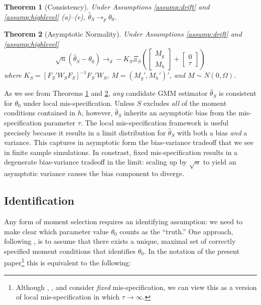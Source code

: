 \documentclass[12pt]{article}
\newtheorem{thm}{Theorem}[section]
\theoremstyle{definition}
\begin{document}
\begin{thm}[Consistency]
\label{thm:consist}
Under Assumptions \ref{assump:drift} and \ref{assump:highlevel} (a)--(e), $\widehat{\theta}_S \rightarrow_{p} \theta_0$.
\end{thm}

\begin{thm}[Asymptotic Normality]
\label{thm:normality}
Under Assumptions \ref{assump:drift} and \ref{assump:highlevel}
$$\sqrt{n}(\widehat{\theta}_S - \theta_0 ) \rightarrow_d -K_S \Xi_S  \left(\left[\begin{array}
	{c} M_g \\ M_h
\end{array} \right]  + \left[\begin{array}
	{c} 0 \\ \tau
\end{array} \right]\right)$$
where $K_S  = [F_S'W_SF_S]^{-1} F_S'W_S$, $M = (M_g', M_h')'$, and $M \sim N(0,\Omega)$.
\end{thm}

As we see from Theorems \ref{thm:consist} and \ref{thm:normality}, \emph{any} candidate GMM estimator $\widehat{\theta}_S$ is consistent for $\theta_0$ under local mis-specification. Unless $S$ excludes \emph{all} of the moment conditions contained in $h$, however, $\widehat{\theta}_S$ inherits an asymptotic bias from the mis-specification parameter $\tau$. The local mis-specification framework is useful precisely because it results in a limit distribution for $\widehat{\theta}_S$ with both a bias \emph{and} a variance. This captures in asymptotic form the bias-variance tradeoff that we see in finite sample simulations. In constrast, fixed mis-specification results in a degenerate bias-variance tradeoff in the limit: scaling up by $\sqrt{n}$ to yield an asymptotic variance causes the bias component to diverge.

\subsection{Identification}
Any form of moment selection requires an identifying assumption: we need to make clear which parameter value $\theta_0$ counts as the ``truth.'' One approach, following \cite{Andrews1999}, is to assume that there exists a unique, maximal set of correctly specified moment conditions that identifies $\theta_0$. In the notation of the present paper\footnote{Although \cite{Andrews1999}, \cite{AndrewsLu}, and \cite{HongPrestonShum} consider \emph{fixed} mis-specification, we can view this as a version of local mis-specification in which $\tau \rightarrow \infty$.}  this is equivalent to the following:
\end{document}
